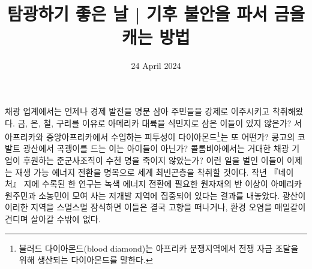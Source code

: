 \documentclass{translation}
\date{24 April 2024}
\title{탐광하기 좋은 날 | 기후 불안을 파서 금을 캐는 방법}
\begin{document}
채광 업계에서는 언제나 경제 발전을 명분 삼아 주민들을 강제로 이주시키고 착취해왔다.
금, 은, 철, 구리를 이유로 아메리카 대륙을 식민지로 삼은 이들이 있지 않은가?
서아프리카와 중앙아프리카에서 수입하는 피투성이 다이아몬드\footnote{블러드 다이아몬드(blood diamond)는 아프리카 분쟁지역에서 전쟁 자금 조달을 위해 생산되는 다이아몬드를 말한다.}는 또 어떤가?
콩고의 코발트 광산에서 곡괭이를 드는 이는 아이들이 아닌가?
콜롬비아에서는 거대한 채광 기업이 후원하는 준군사조직이 수천 명을 죽이지 않았는가?
이런 일을 벌인 이들이 이제는 재생 가능 에너지 전환을 명목으로 세계 최빈곤층을 착취할 것이다.
작년 『네이처』 지에 수록된 한 연구는 녹색 에너지 전환에 필요한 원자재의 반 이상이 아메리카 원주민과 소농민이 모여 사는 저개발 지역에 집중되어 있다는 결과를 내놓았다.
광산이 이러한 지역을 스멀스멀 잠식하면 이들은 결국 고향을 떠나거나, 환경 오염을 매일같이 견디며 살아갈 수밖에 없다.
%
\end{document}
